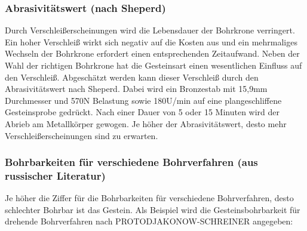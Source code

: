 \documentclass[12pt,a4paper,draft]{scrartcl} %
\begin{document}
\subsubsection{Abrasivitätswert (nach Sheperd)}
Durch Verschleißerscheinungen wird die Lebensdauer der Bohrkrone verringert. Ein hoher Verschleiß wirkt sich negativ auf die Kosten aus und ein mehrmaliges Wechseln der Bohrkrone erfordert einen entsprechenden Zeitaufwand. Neben der Wahl der richtigen Bohrkrone hat die Gesteinsart einen wesentlichen Einfluss auf den Verschleiß. Abgeschätzt werden kann dieser Verschleiß durch den Abrasivitätswert nach Sheperd. Dabei wird ein Bronzestab mit 15,9mm Durchmesser und 570N Belastung sowie 180U/min auf eine plangeschliffene Gesteinsprobe gedrückt. Nach einer Dauer von 5 oder 15 Minuten wird der Abrieb am Metallkörper gewogen. Je höher der Abrasivitätswert, desto mehr Verschleißerscheinungen sind zu erwarten.
\subsubsection{Bohrbarkeiten für verschiedene Bohrverfahren (aus russischer Literatur)}
Je höher die Ziffer für die Bohrbarkeiten für verschiedene Bohrverfahren, desto schlechter Bohrbar ist das Gestein. Als Beispiel wird die Gesteinsbohrbarkeit für drehende Bohrverfahren nach PROTODJAKONOW-SCHREINER angegeben:
\end{document}

